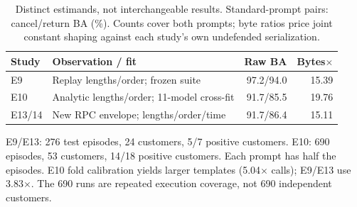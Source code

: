 \begin{table}[t]\centering\footnotesize
\caption{Distinct estimands, not interchangeable results. Standard-prompt pairs: cancel/return BA (\%). Counts cover both prompts; byte ratios price joint constant shaping against each study's own undefended serialization.}\label{tab:r7-cohorts}
\begin{tabularx}{\columnwidth}{@{}lYrr@{}}\toprule
Study & Observation / fit & Raw BA & Bytes$\times$\\\midrule
E9 & Replay lengths/order; frozen suite & 97.2/94.0 & 15.39\\
E10 & Analytic lengths/order; 11-model cross-fit & 91.7/85.5 & 19.76\\
E13/14 & New RPC envelope; lengths/order/time & 91.7/86.4 & 15.11\\\bottomrule
\end{tabularx}
\par\smallskip\raggedright E9/E13: 276 test episodes, 24 customers, 5/7 positive customers. E10: 690 episodes, 53 customers, 14/18 positive customers. Each prompt has half the episodes. E10 fold calibration yields larger templates (5.04$\times$ calls); E9/E13 use 3.83$\times$. The 690 runs are repeated execution coverage, not 690 independent customers.
\end{table}
